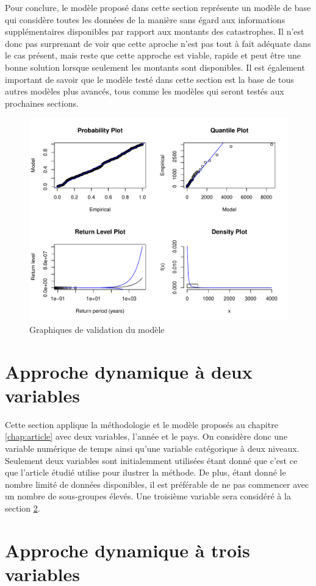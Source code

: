 Pour conclure, le modèle proposé dans cette section représente un modèle de base qui considère toutes les données de la manière sans égard aux informations supplémentaires disponibles par rapport aux montants des catastrophes. Il n'est donc pas surprenant de voir que cette aproche n'est pas tout à fait adéquate dans le cas présent, mais reste que cette approche est viable, rapide et peut être une bonne solution lorsque seulement les montants sont disponibles. Il est également important de savoir que le modèle testé dans cette section est la base de tous autres modèles plus avancés, tous comme les modèles qui seront testés aux prochaines sections.
\begin{figure}[h]
\begin{center}
\includegraphics{images/fig-011}
\end{center}
\caption{Graphiques de validation du modèle}
\label{fig:3.6}
\end{figure}


\clearpage
\section{Approche dynamique à deux variables}
\label{sec:3.3}

Cette section applique la méthodologie et le modèle proposés au chapitre \ref{chap:article} avec deux variables, l'année et le pays. On considère donc une variable numérique de temps ainsi qu'une variable catégorique à deux niveaux. Seulement deux variables sont initialemment utilisées étant donné que c'est ce que l'article étudié utilise pour ilustrer la méthode. De plus, étant donné le nombre limité de données disponibles, il est préférable de ne pas commencer avec un nombre de sous-groupes élevés. Une troisième variable sera considéré à la section \ref{sec:3.4}.


\clearpage
\section{Approche dynamique à trois variables}
\label{sec:3.4}
